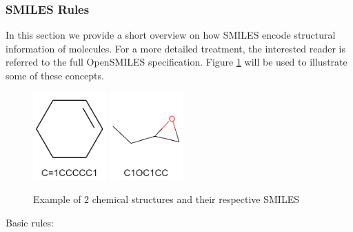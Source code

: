     \subsubsection{SMILES Rules}
    In this section we provide a short overview on how SMILES encode structural information of molecules. For a more detailed treatment, the interested reader is referred to the full OpenSMILES specification. Figure \ref{fig:smile-examples} will be used to illustrate some of these concepts.
    
        \begin{figure}[htb]
        \centering
        \includegraphics[width=0.25\textwidth]{figures/Smiles-Smile1.png}
        \includegraphics[width=0.25\textwidth]{figures/Smiles-Smile2.png}
        \caption{Example of 2 chemical structures and their respective SMILES}
        \label{fig:smile-examples}
    \end{figure}

    Basic rules: 
    
